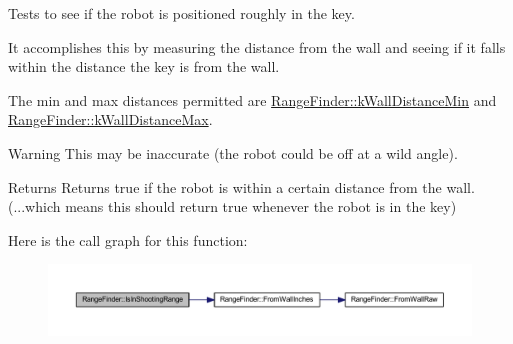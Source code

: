 \-Tests to see if the robot is positioned roughly in the key. 

\-It accomplishes this by measuring the distance from the wall and seeing if it falls within the distance the key is from the wall.

\-The min and max distances permitted are \hyperlink{class_range_finder_aede996e16ed0cfafc6013e12aabdf03a}{\-Range\-Finder\-::k\-Wall\-Distance\-Min} and \hyperlink{class_range_finder_aa95ad17f79c12890881b881339bf9768}{\-Range\-Finder\-::k\-Wall\-Distance\-Max}.

\begin{DoxyWarning}{\-Warning}
\-This may be inaccurate (the robot could be off at a wild angle).
\end{DoxyWarning}
\begin{DoxyReturn}{\-Returns}
\-Returns true if the robot is within a certain distance from the wall. (...which means this should return true whenever the robot is in the key) 
\end{DoxyReturn}


\-Here is the call graph for this function\-:\nopagebreak
\begin{figure}[H]
\begin{center}
\leavevmode
\includegraphics[width=350pt]{class_range_finder_adbf73207e68b627c19bcbf1e53632928_cgraph}
\end{center}
\end{figure}




